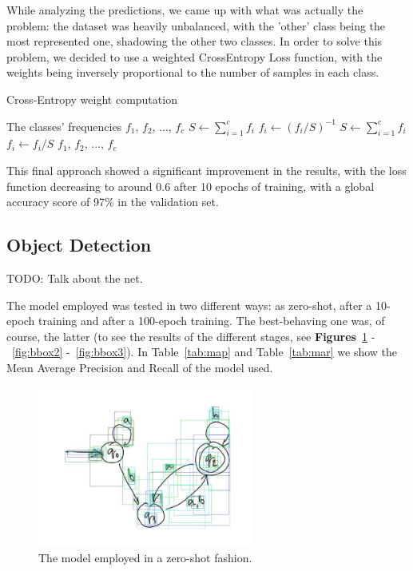 \documentclass[conference]{IEEEtran}
\begin{document}
While analyzing the predictions, we came up with what was actually the problem: the dataset was heavily unbalanced, with the 'other' class being the most represented one, shadowing the other two classes.
In order to solve this problem, we decided to use a weighted CrossEntropy Loss function, with the weights being inversely proportional to the number of samples in each class.

\begin{algorithm}
	\caption{Cross-Entropy weight computation}
	\begin{algorithmic}[1]
		\REQUIRE The classes' frequencies $f_1$, $f_2$, ..., $f_c$
		\STATE $S \gets \sum_{i = 1}^c f_i$
		\STATE $f_i \gets (f_i / S)^{-1}$
		\STATE $S \gets \sum_{i = 1}^c f_i$
		\STATE $f_i \gets f_i / S$
		\RETURN $f_1$, $f_2$, ..., $f_c$
	\end{algorithmic}
\end{algorithm}

This final approach showed a significant improvement in the results, with the loss function decreasing to around 0.6 after 10 epochs of training, with a global accuracy score of 97\% in the validation set.

\subsection{Object Detection}
\label{sec:obj_det}
TODO: Talk about the net.

The model employed was tested in two different ways: as zero-shot, after a 10-epoch training and after a 100-epoch training. The best-behaving one was, of course, the latter (to see the results of the different stages, see \textbf{Figures}~\ref{fig:bbox1} -~\ref{fig:bbox2} -~\ref{fig:bbox3}). In Table~\ref{tab:map} and Table~\ref{tab:mar} we show the Mean Average Precision and Recall of the model used.
\begin{figure}[H]
	\centering
	\includegraphics[width=200pt, height=150pt]{bbox1.jpg}
	\caption{The model employed in a zero-shot fashion.}
	\label{fig:bbox1}
\end{figure}
\end{document}
